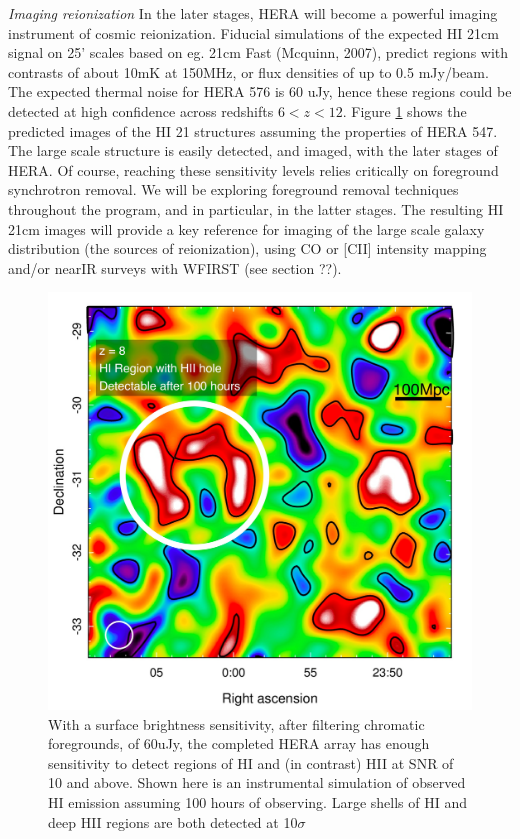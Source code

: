 \documentclass[preprint]{aastex}
\begin{document}
{\sl Imaging reionization} In the later stages, HERA will become a powerful imaging instrument of cosmic reionization. Fiducial simulations of the expected HI 21cm signal on 25' scales based on eg. 21cm Fast (Mcquinn, 2007), predict regions with contrasts of about 10mK at 150MHz, or flux densities of up to 0.5 mJy/beam. The expected thermal noise for HERA 576 is 60 uJy, hence these regions could be detected at high confidence across redshifts $6<z<12$. Figure \ref{imaging} shows the predicted images of the HI 21 structures  assuming the properties of HERA 547. The large scale structure is easily detected, and imaged, with the later stages of HERA. Of course, reaching these sensitivity levels relies critically on foreground synchrotron removal. We will be exploring foreground removal techniques throughout the program, and in particular, in the latter stages. The resulting HI 21cm images will provide a key reference for imaging of the large scale galaxy distribution (the sources of reionization), using CO or [CII] intensity mapping and/or nearIR surveys with WFIRST (see section ??).
\begin{figure}
\centering
\includegraphics[height=4.in]{plots/HERA_z8_SNR_annotated_v2.jpg}
\caption{\small With a surface brightness sensitivity, after filtering chromatic foregrounds, of 60uJy, the completed HERA array has enough sensitivity to detect regions of HI and (in contrast) HII at SNR of 10 and above. Shown here is an instrumental simulation of observed HI emission assuming 100 hours of observing. Large shells of HI and deep HII regions are both detected at 10$\sigma$  \label{imaging}}
\end{figure}
\end{document}
